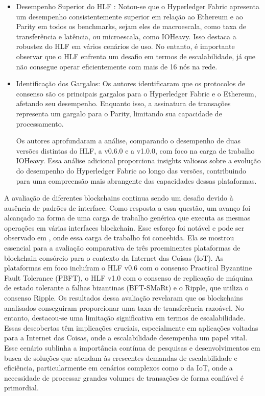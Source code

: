       \begin{itemize}[label= $\star$]
        \item Desempenho Superior do HLF : Notou-se que o Hyperledger Fabric apresenta um desempenho consistentemente superior em relação ao Ethereum e ao Parity em todos os benchmarks, sejam eles de macroescala, como taxa de transferência e latência, ou microescala, como IOHeavy. Isso destaca a robustez do HLF em vários cenários de uso. No entanto, é importante observar que o HLF enfrenta um desafio em termos de escalabilidade, já que não consegue operar eficientemente com mais de 16 nós na rede.

        \item Identificação dos Gargalos: Os autores identificaram que os protocolos de consenso são os principais gargalos para o Hyperledger Fabric e o Ethereum, afetando seu desempenho. Enquanto isso, a assinatura de transações representa um gargalo para o Parity, limitando sua capacidade de processamento.

        Os autores aprofundaram a análise, comparando o desempenho de duas versões distintas do HLF, a v0.6.0 e a v1.0.0, com foco na carga de trabalho IOHeavy. Essa análise adicional proporciona insights valiosos sobre a evolução do desempenho do Hyperledger Fabric ao longo das versões, contribuindo para uma compreensão mais abrangente das capacidades dessas plataformas.\cite{Untangling-blockchain}
      \end{itemize}

      A avaliação de diferentes blockchains continua sendo um desafio devido à ausência de padrões de interface. Como resposta a essa questão, um avanço foi alcançado na forma de uma carga de trabalho genérica que executa as mesmas operações em várias interfaces blockchain. Esse esforço foi notável e pode ser observado em \cite{Evaluating-blockchains}, onde essa carga de trabalho foi concebida. Ela se mostrou essencial para a avaliação comparativa de três proeminentes plataformas de blockchain consórcio para o contexto da Internet das Coisas (IoT). As plataformas em foco incluíram o HLF v0.6 com o consenso Practical Byzantine Fault Tolerance (PBFT), o HLF v1.0 com o consenso de replicação de máquina de estado tolerante a falhas bizantinas (BFT-SMaRt) e o Ripple, que utiliza o consenso Ripple.
      Os resultados dessa avaliação revelaram que os blockchains analisados conseguiram proporcionar uma taxa de transferência razoável. No entanto, destacou-se uma limitação significativa em termos de escalabilidade. Essas descobertas têm implicações cruciais, especialmente em aplicações voltadas para a Internet das Coisas, onde a escalabilidade desempenha um papel vital.
      Esse cenário sublinha a importância contínua de pesquisas e desenvolvimentos em busca de soluções que atendam às crescentes demandas de escalabilidade e eficiência, particularmente em cenários complexos como o da IoT, onde a necessidade de processar grandes volumes de transações de forma confiável é primordial.

